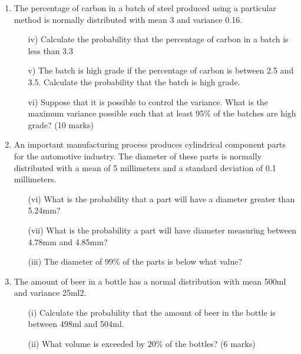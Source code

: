 \documentclass[a4paper,12pt]{article}
\begin{document}
\begin{enumerate}
\item 
The percentage of carbon in a batch of steel produced using a particular method is normally distributed with mean 3 and variance 0.16. 

\begin{itemize}
	\item[iv)]	Calculate the probability that the percentage of carbon in a batch is less than 3.3
	\item[v)]	The batch is high grade if the percentage of carbon is between 2.5 and 3.5. Calculate the probability that the batch is high grade. 
	\item[vi)]	Suppose that it is possible to control the variance. What is the maximum variance possible such that at least 95\% of the batches are high grade?
	(10 marks)
\end{itemize}

	
\item 
An important manufacturing process produces cylindrical component parts for the automotive industry. The diameter of these parts is normally distributed with a mean of 5 millimeters and a standard deviation of 0.1 millimeters.

\begin{itemize}
	\item[(vi)]	What is the probability that a part will have a diameter greater than 5.24mm?
	\item[(vii)] What is the probability a part will have diameter measuring between 4.78mm and 4.85mm?
	\item[(iii)] The diameter of 99\% of the parts is below what value?
\end{itemize}

\item	


The amount of beer in a bottle has a normal distribution with mean 500ml and variance 25ml2.
\begin{itemize}
	\item[(i)]	Calculate the probability that the amount of beer in the bottle is between 498ml and 504ml.
	\item[(ii)]	What volume is exceeded by $20\%$ of the bottles?
	(6 marks)
\end{itemize}



\end{enumerate}
\end{document}

